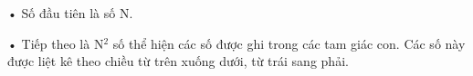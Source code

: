 • Số đầu tiên là số N. 

• Tiếp theo là N$^2$ số thể hiện các số được ghi trong các tam giác con. Các số này được liệt kê theo chiều từ trên xuống dưới, từ trái sang phải.